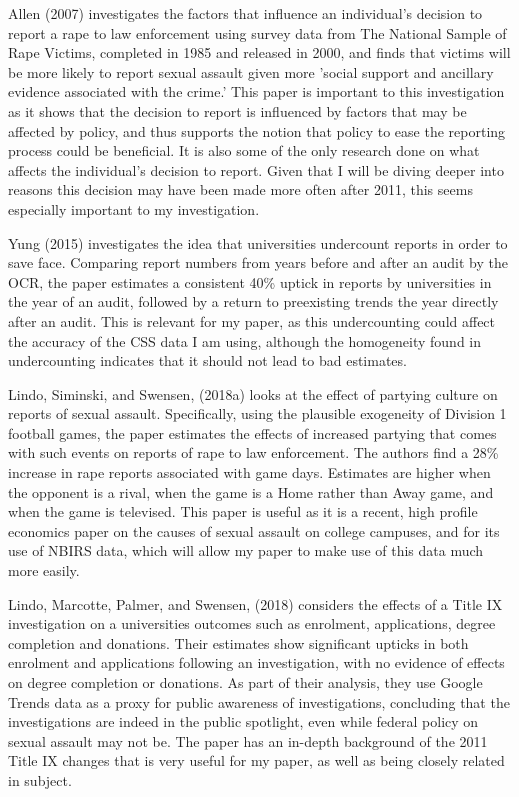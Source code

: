 \documentclass[AER]{AEA}
\begin{document}
Allen (2007) investigates the factors that influence an individual's decision to report a rape to law enforcement using survey data from The National Sample of Rape Victims, completed in 1985 and released in 2000, and finds that victims will be more likely to report sexual assault given more 'social support and ancillary evidence associated with the crime.' This paper is important to this investigation as it shows that the decision to report is influenced by factors that may be affected by policy, and thus supports the notion that policy to ease the reporting process could be beneficial. It is also some of the only research done on what affects the individual's decision to report. Given that I will be diving deeper into reasons this decision may have been made more often after 2011, this seems especially important to my investigation.

Yung (2015) investigates the idea that universities undercount reports in order to save face.  Comparing report numbers from years before and after an audit by the OCR, the paper estimates a consistent 40\% uptick in reports by universities in the year of an audit, followed by a return to preexisting trends the year directly after an audit. This is relevant for my paper, as this undercounting could affect the accuracy of the CSS data I am using, although the homogeneity found in undercounting indicates that it should not lead to bad estimates.

Lindo, Siminski, and Swensen, (2018a) looks at the effect of partying culture on reports of sexual assault. Specifically, using the plausible exogeneity of Division 1 football games, the paper estimates the effects of increased partying that comes with such events on reports of rape to law enforcement. The authors find a 28\% increase in rape reports associated with game days. Estimates are higher when the opponent is a rival, when the game is a Home rather than Away game, and when the game is televised. This paper is useful as it is a recent, high profile economics paper on the causes of sexual assault on college campuses, and for its use of NBIRS data, which will allow my paper to make use of this data much more easily.

Lindo, Marcotte, Palmer, and Swensen, (2018) considers the effects of a Title IX investigation on a universities outcomes such as enrolment, applications, degree completion and donations. Their estimates show significant upticks in both enrolment and applications following an investigation, with no evidence of effects on degree completion or donations. As part of their analysis, they use Google Trends data as a proxy for public awareness of investigations, concluding that the investigations are indeed in the public spotlight, even while federal policy on sexual assault may not be. The paper has an in-depth background of the 2011 Title IX changes that is very useful for my paper, as well as being closely related in subject. 
\end{document}
